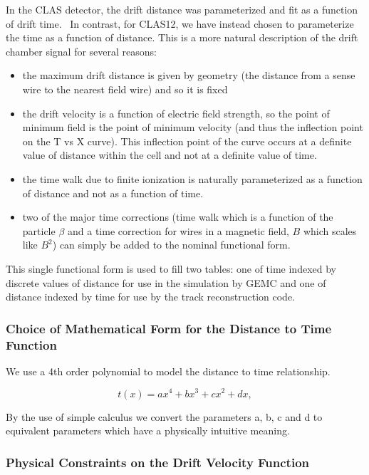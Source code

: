 In the CLAS detector, the drift distance was parameterized and fit as a function
of drift time.~\cite{mdm95}
In contrast, for CLAS12, we have instead chosen to parameterize the time as a function of
distance.  This is a more natural description of the drift chamber signal
for several reasons:
\begin{itemize}
\item the maximum drift distance is given by geometry (the distance from
a sense wire to the nearest field wire) and so it is fixed
\item the drift velocity is a function of electric field strength, so the
point of minimum field is the point of minimum velocity (and thus the inflection point on the T vs X curve). 
This inflection point of the curve occurs at a
definite value of distance within the cell and not at a definite value of time.
\item the time walk due to finite ionization is
naturally parameterized as a function of distance and not as a function of time.
\item two of the major time corrections (time walk which is a function of the
particle $\beta$ and a time correction for wires in a magnetic field, $B$ which
scales like $B^2$) can simply be added to the nominal functional form.
\end{itemize}

This single functional form is used to fill two tables: one of time indexed by discrete
values of distance for use in the simulation by GEMC and one of 
distance indexed by time for use by the track reconstruction code.


\subsubsection{Choice of Mathematical Form for the Distance to Time Function}
We use a 4th order polynomial to model the distance to time relationship.

\begin{equation}
t(x) =  a x^4 + b x^3 + c x^2 + d x,
\end{equation}


By the use of simple calculus we convert the parameters a, b, c and d to equivalent parameters which have
a physically intuitive meaning.

\subsubsection{Physical Constraints on the Drift Velocity Function}

